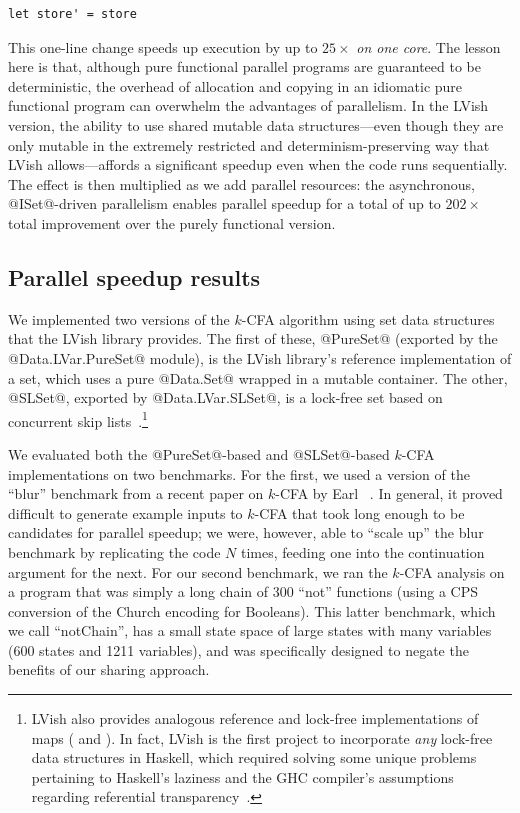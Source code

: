 \singlespacing
\begin{lstlisting}
let store' = store 
\end{lstlisting}
\doublespacing

\noindent This one-line change speeds up execution by up to $25\times$
\emph{on one core}.  The lesson here is that, although pure functional
parallel programs are guaranteed to be deterministic, the overhead of
allocation and copying in an idiomatic pure functional program can
overwhelm the advantages of parallelism.  In the LVish version, the
ability to use shared mutable data structures---even though they are
only mutable in the extremely restricted and determinism-preserving
way that LVish allows---affords a significant speedup even when the
code runs sequentially.  The effect is then multiplied as we add
parallel resources: the asynchronous, @ISet@-driven parallelism
enables parallel speedup for a total of up to $202\times$ total
improvement over the purely functional version.

\subsection{Parallel speedup results}\label{subsection:lvish-parallel-speedup-results}

We implemented two versions of the $k$-CFA algorithm using set data
structures that the LVish library provides.  The first of these,
@PureSet@ (exported by the @Data.LVar.PureSet@ module), is the LVish
library's reference implementation of a set, which uses a pure
@Data.Set@ wrapped in a mutable container.  The other, @SLSet@,
exported by @Data.LVar.SLSet@, is a lock-free set based on concurrent
skip lists~\cite{art}.\footnote{LVish also provides analogous
  reference and lock-free implementations of maps ( and
  ).  In fact, LVish is the first project to incorporate
  \emph{any} lock-free data structures in Haskell, which required
  solving some unique problems pertaining to Haskell's laziness and
  the GHC compiler's assumptions regarding referential
  transparency~\cite{RyanAtomicPrimopsTalk}.}

We evaluated both the @PureSet@-based and @SLSet@-based $k$-CFA
implementations on two benchmarks. For the first, we used a version of
the ``blur'' benchmark from a recent paper on $k$-CFA by Earl
\etal~.  In general, it proved
difficult to generate example inputs to $k$-CFA that took long enough
to be candidates for parallel speedup; we were, however, able to
``scale up'' the blur benchmark by replicating the code $N$ times,
feeding one into the continuation argument for the next.  For our
second benchmark, we ran the $k$-CFA analysis on a program that was
simply a long chain of $300$ ``not'' functions (using a CPS conversion
of the Church encoding for Booleans).  This latter benchmark, which we
call ``notChain'', has a small state space of large states with many
variables (600 states and 1211 variables), and was specifically
designed to negate the benefits of our sharing approach.

